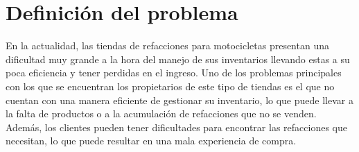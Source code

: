 \section*{Definición del problema}
En la actualidad, las tiendas de refacciones para motocicletas presentan una dificultad muy grande a la hora del manejo de sus inventarios
llevando estas a su poca eficiencia y tener perdidas en el ingreso. 
\newline Uno de los problemas principales con los que se encuentran los propietarios de este tipo de tiendas es el que no cuentan con una manera 
eficiente de gestionar su inventario, lo que puede llevar a la falta de productos o a la acumulación de refacciones que no se venden.
Además, los clientes pueden tener dificultades para encontrar las refacciones que necesitan, lo que puede resultar en una mala experiencia de compra.